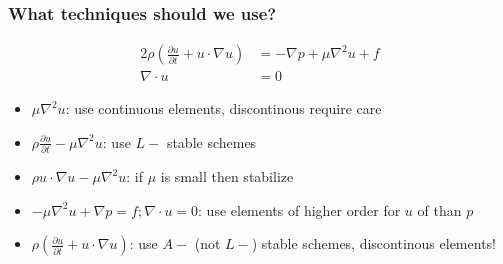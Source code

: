 \begin{frame} 
\frametitle{
  What techniques should we use?}
  \linespread{1.5} 
  \begin{alignat*}{2} \rho (\frac{\partial u}{\partial t} + u \cdot \nabla u)
    &=  -\nabla p  + \mu \nabla^2 u + f   \\
    \nabla \cdot u &= 0  
  \end{alignat*}
  \begin{itemize}
  \item 
  $\mu \nabla^2 u$: use continuous elements, discontinous require care  
  \item
  $\rho \frac{\partial u}{\partial t} - \mu \nabla^2 u$: use $L-$ stable schemes 
  \item 
  $\rho u \cdot \nabla u - \mu \nabla^2 u$: if $\mu$ is small then stabilize     
  \item 
  $ - \mu \nabla^2 u + \nabla p = f;  \nabla \cdot u =  0$: use elements of higher order for $u$ of than $p$  
  \item 
  $\rho (\frac{\partial u}{\partial t} + u \cdot \nabla u)$: use $A-$ (not $L-$) stable schemes, discontinous elements!    
  \end{itemize}


\end{frame}
